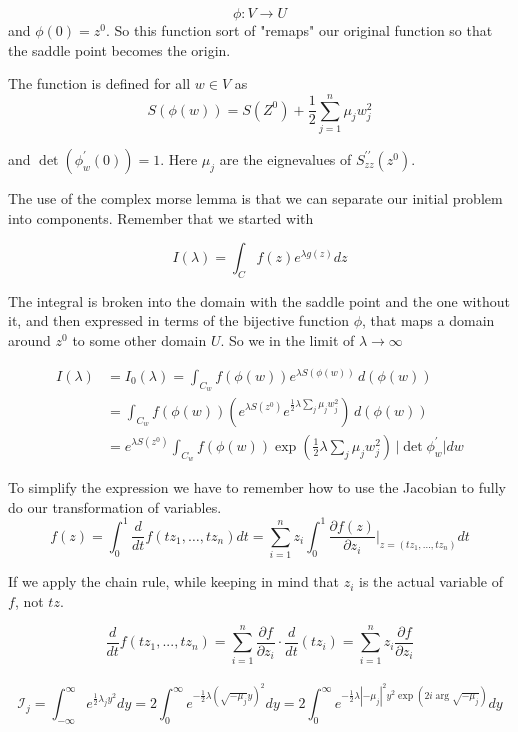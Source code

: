 $$
\phi : V \rightarrow U
$$
and $\phi(0) = z^0$.
So this function sort of "remaps" our original function so that the saddle point becomes the origin.

The function is defined for all $w \in V$ as
$$
S(\phi(w))
=
S(Z^0) + \frac{1}{2} \sum_{j=1}^{n} \mu_j w_{j}^{2}
$$

and $\det(\phi^{\prime}_{w} (0)) = 1$.
Here $\mu_j$ are the eignevalues of $S^{\prime\prime}_{zz} (z^0)$.

The use of the complex morse lemma is that we can separate our initial problem into components.
Remember that we started with

$$
I(\lambda) =
\int_{C} f(z) e^{\lambda g(z)} dz
$$

The integral is broken into the domain with the saddle point and the one without it, and then expressed in terms of
the bijective function $\phi$, that maps a domain around $z^0$ to some other domain $U$.
So we in the limit of $\lambda \rightarrow \infty$

\begin{align*}
I(\lambda) &= I_0 (\lambda) =
\int_{C_w} f(\phi(w)) e^{\lambda S(\phi(w))} \, d\left(\phi (w)\right) \\
&= \int_{C_w} f(\phi(w)) \left( e^{\lambda S(z^0)} e^{\frac{1}{2} \lambda \sum_j \mu_j w_{j}^{2}} \right) \, d\left(\phi (w)\right) \\
&= e^{\lambda S(z^0)} \int_{C_w} f(\phi(w)) \exp\left( \frac{1}{2} \lambda \sum_j \mu_j w_{j}^{2} \right) \, \Big| \det \phi^{\prime}_{w}\Big| dw
\end{align*}

To simplify the expression we have to remember how to use the Jacobian to fully do our transformation of variables.
\\

$$
f(z) = \int_{0}^{1} \frac{d}{dt} f(tz_1 , \dots , tz_n) dt
= 
\sum_{i=1}^{n} z_i \int_{0}^{1} \frac{\partial f(z)}{\partial z_i} \Big|_{z = (tz_1, \dots , tz_n)} dt
$$

If we apply the chain rule, while keeping in mind that $z_i$ is the actual variable of $f$,
not $tz$.

$$
\frac{d}{dt} f(tz_1, ..., tz_n)
=
\sum_{i=1}^{n} \frac{\partial f}{\partial z_i} \cdot \frac{d}{dt}(tz_i)
=
\sum_{i=1}^{n} z_i \frac{\partial f}{\partial z_i}
$$
\\


$$
\mathcal{I}_j
=
\int_{-\infty}^{\infty} e^{\frac{1}{2}\lambda_j y^2} dy
=
2 \int_{0}^{\infty} e^{-\frac{1}{2}\lambda\left(\sqrt{-\mu_j} y\right)^2} dy
=
2 \int_{0}^{\infty} e^{-\frac{1}{2}\lambda |-\mu_j|^2 y^2 \exp(2i \arg \sqrt{-\mu_j})} dy
$$

